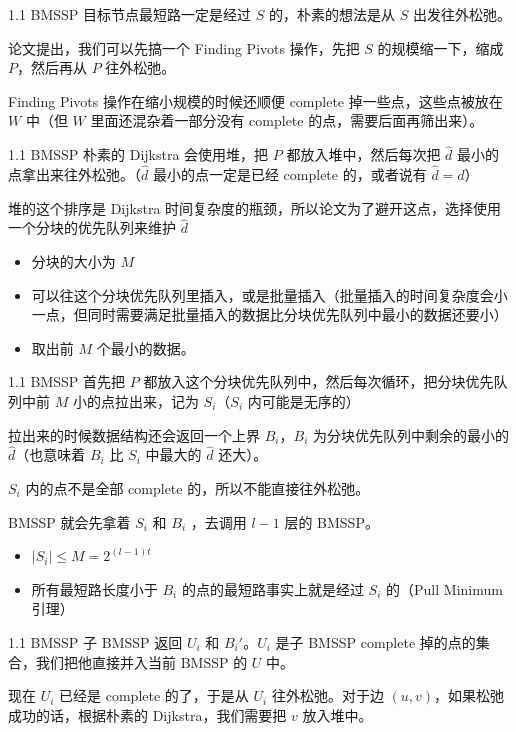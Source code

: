 \documentclass{beamer}
\begin{document}
\begin{frame}{1.1 BMSSP}
  目标节点最短路一定是经过 $S$ 的，朴素的想法是从 $S$ 出发往外松弛。

  \pause\vspace{0.35em}
  论文提出，我们可以先搞一个 Finding Pivots 操作，先把 $S$ 的规模缩一下，缩成 $P$，然后再从 $P$ 往外松弛。

  \pause\vspace{0.35em}
  Finding Pivots 操作在缩小规模的时候还顺便 complete 掉一些点，这些点被放在 $W$ 中（但 $W$ 里面还混杂着一部分没有 complete 的点，需要后面再筛出来）。
\end{frame}
\begin{frame}{1.1 BMSSP}
  朴素的 Dijkstra 会使用堆，把 $P$ 都放入堆中，然后每次把 $\hat{d}$ 最小的点拿出来往外松弛。（$\hat{d}$ 最小的点一定是已经 complete 的，或者说有 $\hat{d} = d$）

  \pause\vspace{0.35em}
  堆的这个排序是 Dijkstra 时间复杂度的瓶颈，所以论文为了避开这点，选择使用一个分块的优先队列来维护 $\hat{d}$

  \pause
  \begin{itemize}
    \item 分块的大小为 $M$
    \item 可以往这个分块优先队列里插入，或是批量插入（批量插入的时间复杂度会小一点，但同时需要满足批量插入的数据比分块优先队列中最小的数据还要小）
    \item 取出前 $M$ 个最小的数据。
  \end{itemize}
\end{frame}

\begin{frame}{1.1 BMSSP}
  首先把 $P$ 都放入这个分块优先队列中，然后每次循环，把分块优先队列中前 $M$ 小的点拉出来，记为 $S_i$（$S_i$ 内可能是无序的）

  \pause

  拉出来的时候数据结构还会返回一个上界 $B_i$，$B_i$ 为分块优先队列中剩余的最小的 $\hat{d}$（也意味着 $B_i$ 比 $S_i$ 中最大的 $\hat{d}$ 还大）。

  \pause\vspace{0.35em}
  $S_i$ 内的点不是全部 complete 的，所以不能直接往外松弛。

  BMSSP 就会先拿着 $S_i$ 和 $B_i$ ，去调用 $l-1$ 层的 BMSSP。

  \pause
  \begin{itemize}
    \item $|S_i|\le M = 2^{(l-1)t}$
    \pause
    \item 所有最短路长度小于 $B_i$ 的点的最短路事实上就是经过 $S_i$ 的（Pull Minimum 引理）
  \end{itemize}
\end{frame}
\begin{frame}{1.1 BMSSP}
  子 BMSSP 返回 $U_i$ 和 $B_i'$。$U_i$ 是子 BMSSP complete 掉的点的集合，我们把他直接并入当前 BMSSP 的 $U$ 中。

  \pause

  现在 $U_i$ 已经是 complete 的了，于是从 $U_i$ 往外松弛。对于边 $(u,v)$，如果松弛成功的话，根据朴素的 Dijkstra，我们需要把 $v$ 放入堆中。
\end{frame}
\end{document}
